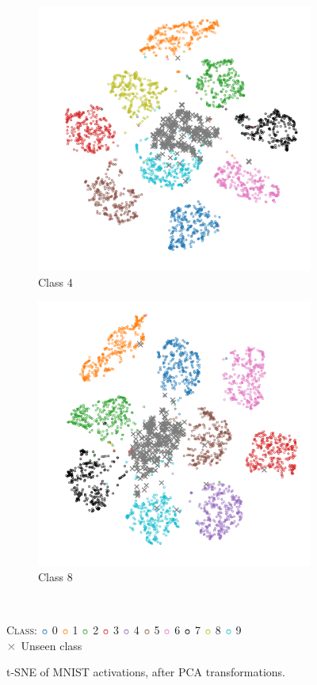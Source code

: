 \documentclass[10pt]{article}
\newcommand{\legendBulletMNIST}{
    \begin{minipage}[t]{0.5\textwidth}
    \centering
    \textsc{Class}:
    ${\color[rgb]{0.12, 0.47, 0.71}\boldsymbol{\circ}}$ 0
    ${\color[rgb]{1.0, 0.5, 0.05}\boldsymbol{\circ}}$ 1
    ${\color[rgb]{0.17, 0.63, 0.17}\boldsymbol{\circ}}$ 2
    ${\color[rgb]{0.84, 0.15, 0.16}\boldsymbol{\circ}}$ 3
    ${\color[rgb]{0.58, 0.4, 0.74}\boldsymbol{\circ}}$ 4
    ${\color[rgb]{0.55, 0.34, 0.29}\boldsymbol{\circ}}$ 5
    ${\color[rgb]{0.89, 0.47, 0.76}\boldsymbol{\circ}}$ 6
    ${\color[rgb]{0, 0, 0}\boldsymbol{\circ}}$ 7
    ${\color[rgb]{0.74, 0.74, 0.13}\boldsymbol{\circ}}$ 8
    ${\color[rgb]{0.09, 0.75, 0.81}\boldsymbol{\circ}}$ 9\\
    ${\color[rgb]{0.5, 0.5, 0.5}\boldsymbol{\times}}$ Unseen class
    \end{minipage}
    }
\begin{document}
\begin{figure}[H]
    \centering
    \begin{subfigure}{.49\textwidth}
        \centering
        \includegraphics[width=\textwidth]{MNIST_t-SNE_wo_cl_4_after}
        \caption{Class 4}
    \end{subfigure}
    \begin{subfigure}{.5\textwidth}
        \centering
        \includegraphics[width=\textwidth]{MNIST_t-SNE_wo_cl_8_after}
        \caption{Class 8}
    \end{subfigure}
    \\[.2cm]
    \legendBulletMNIST
    \caption{t-SNE of \gls{MNIST} activations, after \gls{PCA} transformations.}
    \label{fig:tsne-mnist-miscl}
\end{figure}
\end{document}
